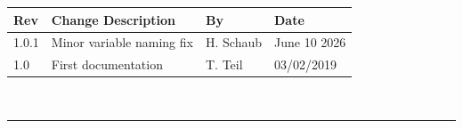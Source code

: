 \documentclass[]{BasiliskReportMemo}
\begin{document}
\makeCover

%
%
\pagestyle{empty}
{\renewcommand{\arraystretch}{2}
\noindent
\begin{longtable}{|p{0.5in}|p{3.5in}|p{1.07in}|p{0.9in}|}
\hline
{\bfseries Rev} & {\bfseries Change Description} & {\bfseries By}& {\bfseries Date} \\
\hline
1.0.1 & Minor variable naming fix & H. Schaub & June 10 2026\\
1.0 & First documentation & T. Teil & 03/02/2019\\
\hline

\end{longtable}
}



\newpage
\setcounter{page}{1}
\pagestyle{fancy}

\tableofcontents %
~\\ \hrule ~\\ %




















\end{document}
